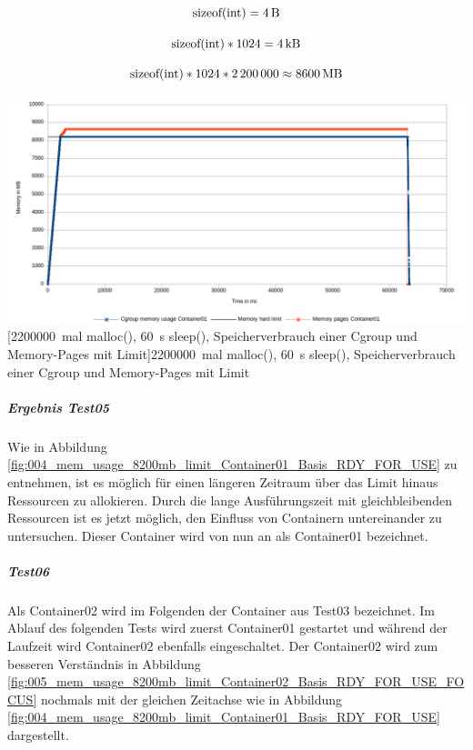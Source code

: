 \[\mathrm{sizeof(int)} = \SI{4}{\byte}\]

\[\mathrm{sizeof(int)} * \SI{1024}{} = \SI{4}{\kilo\byte}\]

\[\mathrm{sizeof(int)} * \SI{1024}{} * \SI{2200000}{} \approx \SI{8600}{\mega\byte} \]


\vspace{1em}
\begin{minipage}{\linewidth}
	\centering
	\includegraphics[width=1\linewidth]{pics/004_mem_usage_8200mb_limit_Container01_Basis_RDY_FOR_USE.png}
	[\SI{2200000}{mal} malloc(), \SI{60}{\second} sleep(), Speicherverbrauch einer Cgroup und Memory-Pages mit Limit]{\SI{2200000}{mal} malloc(), \SI{60}{\second} sleep(), Speicherverbrauch einer Cgroup und Memory-Pages mit Limit}
	\label{fig:004_mem_usage_8200mb_limit_Container01_Basis_RDY_FOR_USE}
\end{minipage}

\subparagraph{Ergebnis Test05}
Wie in Abbildung \ref{fig:004_mem_usage_8200mb_limit_Container01_Basis_RDY_FOR_USE} zu entnehmen, ist es möglich für einen längeren Zeitraum über das Limit hinaus Ressourcen zu allokieren. Durch die lange Ausführungszeit mit gleichbleibenden Ressourcen ist es jetzt möglich, den Einfluss von Containern untereinander zu untersuchen. Dieser Container wird von nun an als Container01 bezeichnet.

\subparagraph{Test06}
Als Container02 wird im Folgenden der Container aus Test03 bezeichnet. Im Ablauf des folgenden Tests wird zuerst Container01 gestartet und während der Laufzeit wird Container02 ebenfalls eingeschaltet. Der Container02 wird zum besseren Verständnis in Abbildung \ref{fig:005_mem_usage_8200mb_limit_Container02_Basis_RDY_FOR_USE_FOCUS} nochmals mit der gleichen Zeitachse wie in Abbildung \ref{fig:004_mem_usage_8200mb_limit_Container01_Basis_RDY_FOR_USE} dargestellt. 


